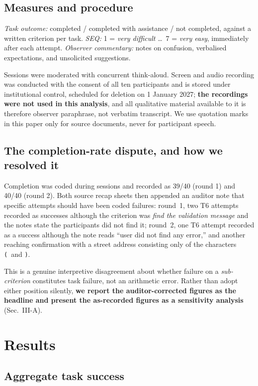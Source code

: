 \documentclass[conference]{IEEEtran}
\begin{document}
\subsection{Measures and procedure}

\emph{Task outcome:} completed / completed with assistance / not completed,
against a written criterion per task. \emph{SEQ:} 1 = \emph{very difficult}
\ldots\ 7 = \emph{very easy}, immediately after each attempt. \emph{Observer
commentary:} notes on confusion, verbalised expectations, and unsolicited
suggestions.

Sessions were moderated with concurrent think-aloud. Screen and audio recording was conducted with the
consent of all ten participants and is stored under institutional control, scheduled for deletion on
1 January 2027; \textbf{the recordings were not used in this analysis}, and all qualitative material
available to it is therefore observer paraphrase, not verbatim transcript. We use quotation marks in
this paper only for source documents, never for participant speech.

\subsection{The completion-rate dispute, and how we resolved it}

Completion was coded during sessions and recorded as 39/40 (round 1) and
40/40 (round 2). Both source recap sheets then appended an auditor note that
specific attempts should have been coded failures: round~1, two T6 attempts
recorded as successes although the criterion was \emph{find the validation
message} and the notes state the participants did not find it; round~2, one T6
attempt recorded as a success although the note reads ``user did not find any
error,'' and another reaching confirmation with a street address consisting
only of the characters \texttt{(}\ and \texttt{)}.

This is a genuine interpretive disagreement about whether failure on a
\emph{sub-criterion} constitutes task failure, not an arithmetic error. Rather
than adopt either position silently, \textbf{we report the auditor-corrected
figures as the headline and present the as-recorded figures as a sensitivity
analysis} (Sec.~III-A).

\section{Results}

\subsection{Aggregate task success}
\end{document}
